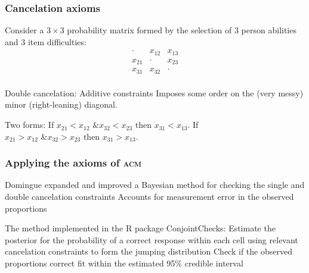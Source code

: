 \documentclass[10pt,serif,professionalfont]{beamer}
\begin{document}
\begin{frame}
    \frametitle{Cancelation axioms}

    Consider a $3 \times 3$ probability matrix formed by the selection of 3 person abilities and 3 item difficulties:
    \[
    \begin{array}{ccc}
      \cdot&x_{12} &x_{13}  \\
      x_{21}&\cdot&x_{23} \\
      x_{31} & x_{32}&\cdot\\
    \end{array}
    \]

    \begin{outline}
        \1 Double cancelation: Additive constraints
            \2 Imposes some order on the (very messy) minor (right-leaning) diagonal.

        \vspace{0.1cm}

        \1 Two forms:
            \2 If $x_{21}<x_{12} \text{ \& } x_{32}<x_{23} \text{ then } x_{31}<x_{13}$.
            \2 If $x_{21}>x_{12} \text{ \& } x_{32}>x_{23} \text{ then } x_{31}>x_{13}$.

    \end{outline}

\end{frame}

\begin{frame}
    \frametitle{Applying the axioms of \textsc{acm}}

    \begin{outline}
        \1 Domingue expanded and improved a Bayesian method for checking the single and double cancelation constraints
            \2 Accounts for measurement error in the observed proportions

        \vspace{0.25cm}

        \1 The method implemented in the R package ConjointChecks:
            \2 Estimate the posterior for the probability of a correct response within each cell using relevant cancelation constraints to form the jumping distribution
            \2 Check if the observed proportions correct fit within the estimated 95\% credible interval

    \end{outline}

\end{frame}
\end{document}
